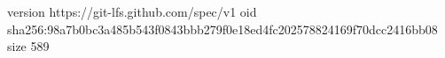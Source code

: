 version https://git-lfs.github.com/spec/v1
oid sha256:98a7b0bc3a485b543f0843bbb279f0e18ed4fc202578824169f70dcc2416bb08
size 589
